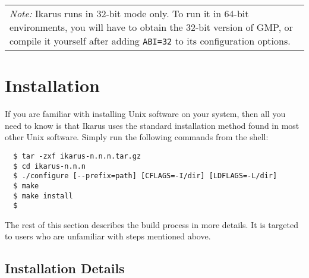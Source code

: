 \documentclass[onecolumn, 12pt, twoside, openright, dvipdfm]{book}
\newcommand{\BoxedText}[2]{
  \vspace{.05in}
  \begin{center}
    \begin{tabular}{|p{4.6in}|} {\large \emph{#1}} #2 \end{tabular}
  \end{center}
  \vspace{.05in}
}
\begin{document}
\BoxedText{Note:}{Ikarus runs in 32-bit mode only.  
To run it in 64-bit environments, you will have to obtain the 32-bit
version of GMP, or compile it yourself after adding \texttt{ABI=32}
to its configuration options.}


\section{Installation}

If you are familiar with installing Unix software on your system,
then all you need to know is that Ikarus uses the standard
installation method found in most other Unix software.  Simply run
the following commands from the shell:
\begin{verbatim}
  $ tar -zxf ikarus-n.n.n.tar.gz
  $ cd ikarus-n.n.n
  $ ./configure [--prefix=path] [CFLAGS=-I/dir] [LDFLAGS=-L/dir]
  $ make
  $ make install
  $
\end{verbatim}

The rest of this section describes the build process in more
details.  It is targeted to users who are unfamiliar with steps
mentioned above.

\subsection{Installation Details}
\end{document}
